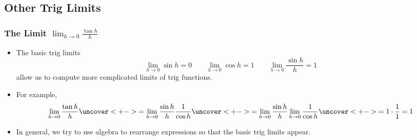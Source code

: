 \documentclass[ignorenonframetext]{beamer}
\newcommand{\ds}{\displaystyle}
\begin{document}
\begin{frame}
\begin{columns}
  \end{columns}
\end{frame}


\subsection{Other Trig Limits}

\begin{frame}
  \frametitle{The Limit $\ds \lim_{h\to 0} \frac{\tan h}{h}$}
  \begin{itemize}[<+->]
  \item The basic trig limits
    \begin{displaymath}
      \lim_{h\to 0} \sin h = 0
      \qquad
      \lim_{h\to 0} \cos h = 1
      \qquad
      \lim_{h\to 0} \frac{\sin h}{h} = 1
    \end{displaymath}
    allow us to compute more complicated limits of trig functions.
  \item For example,
    \begin{displaymath}
      \lim_{h\to 0} \frac{\tan h}{h}
      \uncover<+->{= \lim_{h\to 0} \frac{\sin h}{h} \frac{1}{\cos h}}%
      \uncover<+->{= \lim_{h\to 0} \frac{\sin h}{h} \lim_{h\to 0} \frac{1}{\cos h}}%
      \uncover<+->{= 1 \cdot \frac{1}{1} = 1}%
    \end{displaymath}
  \item In general, we try to use algebra to rearrange expressions so that
    the basic trig limits appear.
  \end{itemize}
\end{frame}
\end{document}
